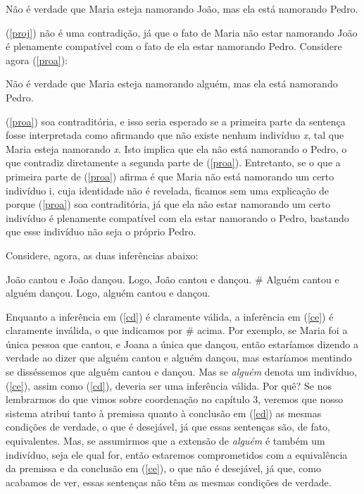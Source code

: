 \begin{exe}
\ex Não é verdade que Maria esteja namorando João, mas ela está
namorando Pedro.\label{proj}
\end{exe}

\n (\ref{proj}) não é uma contradição, já que o fato de Maria não
estar namorando João é plenamente compatível com o fato de ela
estar namorando Pedro. Considere agora (\ref{proa}):

\begin{exe}
\ex Não é verdade que Maria esteja namorando alguém, mas ela está
namorando Pedro.\label{proa}
\end{exe}

\n (\ref{proa}) soa contraditória, e isso seria esperado se a
primeira parte da sentença fosse interpretada como afirmando que
não existe nenhum indivíduo \textit{x}, tal que Maria esteja
namorando \textit{x}. Isto implica que ela não está namorando o
Pedro, o que contradiz diretamente a segunda parte de
(\ref{proa}). Entretanto, se o que a primeira parte de
(\ref{proa}) afirma é que Maria não está namorando um certo
indivíduo i, cuja identidade não é revelada, ficamos sem uma
explicação de porque (\ref{proa}) soa contraditória, já que ela
não estar namorando um certo indivíduo é plenamente compatível com
ela estar namorando o Pedro, bastando que esse indivíduo não seja
o próprio Pedro.

Considere, agora, as duas inferências abaixo:

\begin{exe}
    \ex João cantou e João dançou. Logo, João cantou e dançou.\label{cd}
    \ex \# Alguém cantou e alguém dançou. Logo, alguém cantou e dançou.
    \label{ce}
\end{exe}

\n Enquanto a inferência em (\ref{cd}) é claramente válida, a
inferência em (\ref{ce}) é claramente inválida, o que indicamos por \# acima. Por exemplo, se
Maria foi a única pessoa que cantou, e Joana a única que dançou,
então estaríamos dizendo a verdade ao dizer que alguém cantou e
alguém dançou, mas estaríamos mentindo se disséssemos que alguém
cantou e dançou. Mas se \textit{alguém} denota um indivíduo, (\ref{ce}),
assim como (\ref{cd}), deveria ser uma inferência válida. Por quê?
Se nos lembrarmos do que vimos sobre coordenação no capítulo 3,
veremos que nosso sistema atribui tanto à premissa quanto à
conclusão em (\ref{cd}) as mesmas condições de verdade, o que é
desejável, já que essas sentenças são, de fato, equivalentes. Mas, se assumirmos que a extensão de \textit{alguém} é também um indivíduo,
seja ele qual for, então estaremos comprometidos com a
equivalência da premissa e da conclusão em (\ref{ce}), o que não é
desejável, já que, como acabamos de ver, essas sentenças não têm as
mesmas condições de verdade.

